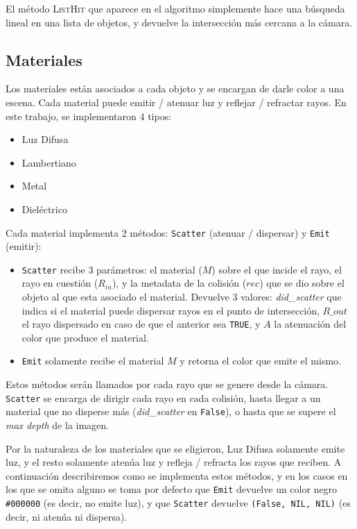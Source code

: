 El método \textsc{ListHit} que aparece en el algoritmo simplemente hace una
búsqueda lineal en una lista de objetos, y devuelve la intersección más cercana
a la cámara.

\subsection{Materiales}

Los materiales están asociados a cada objeto y se encargan de darle color a una
escena. Cada material puede emitir / atenuar luz y reflejar / refractar
rayos. En este trabajo, se implementaron 4 tipos:

\begin{itemize}
    \item Luz Difusa
    \item Lambertiano
    \item Metal
    \item Dieléctrico
\end{itemize}

Cada material implementa 2 métodos: \texttt{Scatter} (atenuar / dispersar) y
\texttt{Emit} (emitir):

\begin{itemize}
    \item \texttt{Scatter} recibe 3 parámetros: el material ($M$) sobre el que
        incide el rayo, el rayo en cuestión ($R_{in}$), y la metadata de la
        colisión ($rec$) que se dio sobre el objeto al que esta asociado el
        material. Devuelve 3 valores: \textit{did\_scatter} que indica si el
        material puede dispersar rayos en el punto de intersección,
        $R\_{out}$ el rayo dispersado en caso de que el anterior sea
        \texttt{TRUE}, y $A$ la atenuación del color que produce el material.
    \item \texttt{Emit} solamente recibe el material $M$ y retorna el color que
        emite el mismo.
\end{itemize}

Estos métodos serán llamados por cada rayo que se genere desde la cámara.
\texttt{Scatter} se encarga de dirigir cada rayo en cada colisión, hasta llegar
a un material que no disperse más (\textit{did\_scatter} en \texttt{False}), o
hasta que se supere el \textit{max depth} de la imagen.

Por la naturaleza de los materiales que se eligieron, Luz Difusa solamente emite
luz, y el resto solamente atenúa luz  y refleja / refracta los rayos que
reciben. A continuación describiremos como se implementa estos métodos, y en los
casos en los que se omita alguno se toma por defecto que \texttt{Emit} devuelve
un color negro \texttt{\#000000} (es decir, no emite luz), y que
\texttt{Scatter} devuelve \texttt{(False, NIL, NIL)} (es decir, ni atenúa ni
dispersa).

